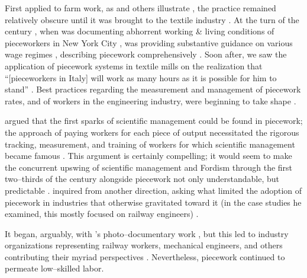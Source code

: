 \documentclass[trackingWork]{subfiles}
\begin{document}
First applied to farm work, as
\citeauthor{hughRaynbirdTaskWork} and others illustrate%
, the practice remained relatively obscure until
it was brought to the textile industry
\cite{hughRaynbirdTaskWork}.
At the turn of the  century%
, when \citeauthor{riisOtherSideLives} was documenting abhorrent working \& living conditions of pieceworkers in New York City%
, \citeauthor{norton1900textile} was providing substantive guidance on various wage regimes%
, describing piecework comprehensively
\cite{riisOtherSideLives,norton1900textile}.
Soon after,
we saw the application of piecework systems in textile mills on the realization that
``[pieceworkers in Italy] will work as many hours as it is possible for him to stand''
\cite{clark1908cotton}.
Best practices regarding the measurement and management of
piecework rates, and of workers in the engineering industry,
were beginning to take shape
\cite{burton1899commercial}.

\citeauthor{10.2307/23702539} argued that the first sparks of scientific management
could be found in piecework;
the approach of paying workers for each piece of output necessitated
the rigorous tracking, measurement, and training of workers
for which scientific management became famous
\cite{10.2307/23702539}.
This argument is certainly compelling;
it would seem to make the concurrent upswing of
scientific management and Fordism
through the first two--thirds of the  century
alongside piecework not only understandable, but predictable
\cite{hart2013rise}.
\citeauthor{Brown01041990} inquired from another direction, asking
what limited the adoption of piecework in industries that otherwise gravitated toward it
(in the case studies he examined, this mostly focused on railway engineers)
\cite{Brown01041990}.


It began, arguably, with \citeauthor{riisOtherSideLives}'s photo--documentary work%
, but this led to industry organizations representing
railway workers, mechanical engineers, and others contributing their myriad perspectives
\cite{american1921problem,richards1904anything,riisOtherSideLives}.
Nevertheless, piecework continued to permeate low--skilled labor.
\end{document}
